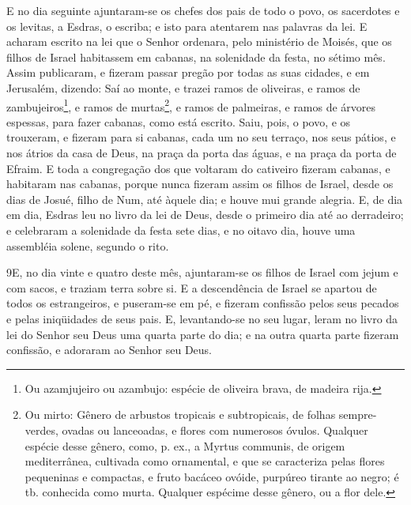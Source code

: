 E no dia seguinte ajuntaram-se os chefes dos pais de todo o povo,
os sacerdotes e os levitas, a Esdras, o escriba; e isto para
atentarem nas palavras da lei. E acharam escrito na lei que o
Senhor ordenara, pelo ministério de Moisés, que os filhos de Israel
habitassem em cabanas, na solenidade da festa, no sétimo mês.
Assim publicaram, e fizeram passar pregão por todas as suas
cidades, e em Jerusalém, dizendo: Saí ao monte, e trazei ramos de
oliveiras, e ramos de zambujeiros\footnote{Ou azamjujeiro ou
azambujo: espécie de oliveira brava, de madeira rija.}, e ramos de
murtas\footnote{Ou mirto: Gênero de arbustos tropicais e
subtropicais, de folhas sempre-verdes, ovadas ou lanceoadas, e
flores com numerosos óvulos. Qualquer espécie desse gênero, como, p.
ex., a Myrtus communis, de origem mediterrânea, cultivada como
ornamental, e que se caracteriza pelas flores pequeninas e
compactas, e fruto bacáceo ovóide, purpúreo tirante ao negro; é tb.
conhecida como murta. Qualquer espécime desse gênero, ou a flor
dele.}, e ramos de palmeiras, e ramos de árvores espessas, para
fazer cabanas, como está escrito. Saiu, pois, o povo, e os
trouxeram, e fizeram para si cabanas, cada um no seu terraço, nos
seus pátios, e nos átrios da casa de Deus, na praça da porta das
águas, e na praça da porta de Efraim. E toda a congregação
dos que voltaram do cativeiro fizeram cabanas, e habitaram nas
cabanas, porque nunca fizeram assim os filhos de Israel, desde os
dias de Josué, filho de Num, até àquele dia; e houve mui grande
alegria. E, de dia em dia, Esdras leu no livro da lei de
Deus, desde o primeiro dia até ao derradeiro; e celebraram a
solenidade da festa sete dias, e no oitavo dia, houve uma assembléia
solene, segundo o rito.

\medskip

\lettrine{9} E, no dia vinte e quatro deste mês, ajuntaram-se
os filhos de Israel com jejum e com sacos, e traziam terra sobre si.
E a descendência de Israel se apartou de todos os estrangeiros,
e puseram-se em pé, e fizeram confissão pelos seus pecados e pelas
iniqüidades de seus pais. E, levantando-se no seu lugar, leram
no livro da lei do Senhor seu Deus uma quarta parte do dia; e na
outra quarta parte fizeram confissão, e adoraram ao Senhor seu Deus.

